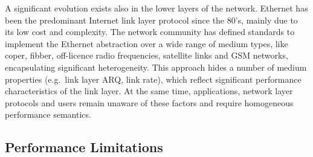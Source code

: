 A significant evolution exists also in the lower layers of the network.
Ethernet has been the predominant Internet link layer protocol since the 80's,
mainly due to its low cost and complexity. The network community has defined
standards to implement the Ethernet abstraction over a wide range of medium
types, like coper, fibber, off-licence radio frequencies, satellite links and
GSM networks, encapsulating significant heterogeneity. This approach hides a
number of medium properties (e.g.~link layer ARQ, link rate), which reflect
significant performance characteristics of the link layer. At the same time,
applications, network layer protocols and users remain unaware of these factors
and require homogeneous performance semantics. 


\subsection{Performance Limitations} \label{sec:intro:control_limitations}

